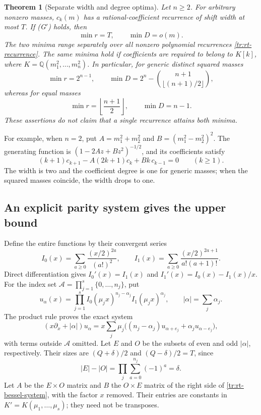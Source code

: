 \documentclass[11pt,a4paper]{article}
\newtheorem{theorem}{Theorem}[section]
\theoremstyle{definition}
\theoremstyle{remark}
\numberwithin{equation}{section}
\begin{document}
\begin{theorem}[Separate width and degree optima]
\label{tr:rt-main}
Let $n\ge2$.  For arbitrary nonzero masses, $c_k(m)$ has a
rational-coefficient recurrence of shift width at most $T$.
If \textup{(G$'$)} holds, then
\begin{equation}
\label{tr:rt-two-optima}
 \min r=T,\qquad \min D=o(m).
\end{equation}
The two minima range separately over all nonzero polynomial
recurrences \eqref{tr:rt-recurrence}.  The same minima hold if
coefficients are required to belong to
$K[k]$, where $K=\mathbb Q(m_1^2,\ldots,m_n^2)$.
In particular, for generic distinct squared masses
\[
 \min r=2^{n-1},\qquad
 \min D=2^n-\binom{n+1}{\lfloor(n+1)/2\rfloor},
\]
whereas for equal masses
\[
 \min r=\left\lfloor\frac{n+1}{2}\right\rfloor,
 \qquad \min D=n-1.
\]
These assertions do not claim that a single recurrence attains both
minima.
\end{theorem}

For example, when $n=2$, put $A=m_1^2+m_2^2$ and
$B=(m_1^2-m_2^2)^2$.  The generating function is
$(1-2Az+Bz^2)^{-1/2}$, and its coefficients satisfy
\[
 (k+1)c_{k+1}-A(2k+1)c_k+Bk\,c_{k-1}=0\qquad(k\ge1).
\]
The width is two and the coefficient degree is one for generic
masses; when the squared masses coincide, the width drops to one.


\subsection{An explicit parity system gives the upper bound}

Define the entire functions by their convergent series
\[
 I_0(x)=\sum_{a\ge0}\frac{(x/2)^{2a}}{(a!)^2},\qquad
 I_1(x)=\sum_{a\ge0}\frac{(x/2)^{2a+1}}{a!(a+1)!}.
\]
Direct differentiation gives
$I_0'(x)=I_1(x)$ and $I_1'(x)=I_0(x)-I_1(x)/x$.
For the index set
$\mathcal A=\prod_{j=1}^s\{0,\ldots,n_j\}$, put
\[
 u_\alpha(x)=\prod_{j=1}^s
       I_0(\mu_jx)^{n_j-\alpha_j}I_1(\mu_jx)^{\alpha_j},
 \qquad |\alpha|=\sum_j\alpha_j.
\]
The product rule proves the exact system
\begin{equation}
\label{tr:rt-bessel-system}
 (x\partial_x+|\alpha|)u_\alpha
 =x\sum_j\mu_j\bigl((n_j-\alpha_j)u_{\alpha+e_j}
                       +\alpha_j u_{\alpha-e_j}\bigr),
\end{equation}
with terms outside $\mathcal A$ omitted.  Let $E$ and $O$ be the
subsets of even and odd $|\alpha|$, respectively.  Their sizes are
$(Q+\delta)/2$ and $(Q-\delta)/2=T$, since
\[
 |E|-|O|=\prod_j\sum_{a=0}^{n_j}(-1)^a=\delta.
\]
Let $A$ be the $E\times O$ matrix and $B$ the $O\times E$ matrix
of the right side of \eqref{tr:rt-bessel-system}, with the factor $x$
removed.  Their entries are constants in
$K'=K(\mu_1,\ldots,\mu_s)$; they need not be transposes.
\end{document}
